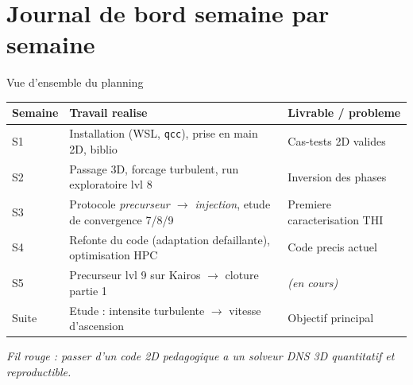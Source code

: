 \documentclass[11pt,aspectratio=169]{beamer}
\begin{document}
\section{Journal de bord semaine par semaine}
\begin{frame}{Vue d'ensemble du planning}
  \footnotesize
  \begin{tabular}{@{}p{1.3cm}p{7.0cm}p{4.2cm}@{}}
    \toprule
    \textbf{Semaine} & \textbf{Travail realise} & \textbf{Livrable / probleme} \\
    \midrule
    S1 & Installation (WSL, \texttt{qcc}), prise en main 2D, biblio
       & Cas-tests 2D valides \\
    S2 & Passage 3D, forcage turbulent, run exploratoire lvl 8
       & \textcolor{warnred}{Inversion des phases} \\
    S3 & Protocole \emph{precurseur $\to$ injection}, etude de convergence 7/8/9
       & Premiere caracterisation THI \\
    S4 & \textcolor{warnred}{Refonte du code} (adaptation defaillante), optimisation HPC
       & Code precis actuel \\
    S5 & Precurseur lvl 9 sur Kairos $\to$ cloture partie 1
       & \emph{(en cours)} \\
    \rowcolor{imftlight!15}
    Suite & Etude : intensite turbulente $\to$ vitesse d'ascension
       & Objectif principal \\
    \bottomrule
  \end{tabular}
  \vspace{0.6em}
  \begin{center}
    \scriptsize\itshape
    Fil rouge : passer d'un code 2D pedagogique a un solveur DNS 3D
    quantitatif et reproductible.
  \end{center}
\end{frame}
\end{document}
